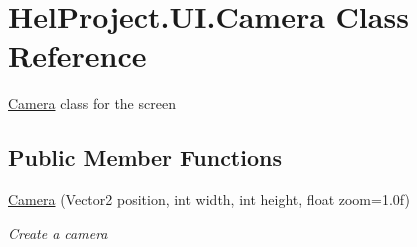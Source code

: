 \hypertarget{class_hel_project_1_1_u_i_1_1_camera}{}\section{Hel\+Project.\+U\+I.\+Camera Class Reference}
\label{class_hel_project_1_1_u_i_1_1_camera}


\hyperlink{class_hel_project_1_1_u_i_1_1_camera}{Camera} class for the screen  


\subsection*{Public Member Functions}
\begin{DoxyCompactItemize}
\item 
\hyperlink{class_hel_project_1_1_u_i_1_1_camera_a82aef3e39d157279ce806ab9e141e014}{Camera} (Vector2 position, int width, int height, float zoom=1.\+0f)
\begin{DoxyCompactList}\small\item\em Create a camera \end{DoxyCompactList}\end{DoxyCompactItemize}
